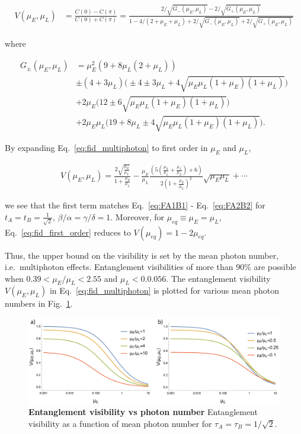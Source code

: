 \documentclass[11pt]{caltech_thesis} %
\begin{document}
\hypertarget{eq:fid_multiphoton}{}{
\begin{align}
    V(\mu_E, \mu_L) &= \frac{C(0)-C(\pi)}{C(0)+C(\pi)}=\frac{2/\sqrt{G_{-}(\mu_E, \mu_L)}-2/\sqrt{G_{+}(\mu_E, \mu_L)}}{1-4/(2+\mu_E+\mu_L)+2/\sqrt{G_{-}(\mu_E, \mu_L)}+2/\sqrt{G_{+}(\mu_E, \mu_L)}}\label{eq:fid_multiphoton}
\end{align}
}

where

\begin{align}
     G_{\pm}(\mu_E, \mu_L)&=\mu_E^2(9+8\mu_L(2+\mu_L))\\
     &\pm(4+3\mu_L)\bigg(\pm4\pm3\mu_L+4\sqrt{\mu_E \mu_L (1+\mu_E)(1+\mu_L)}\bigg)\nonumber\\     &+2\mu_E\bigg(12\pm6\sqrt{\mu_E\mu_L(1+\mu_E)(1+\mu_L)}\bigg)\nonumber\\
     &+2\mu_E\mu_L\Big(19+8\mu_L \pm 4\sqrt{\mu_E\mu_L (1+\mu_E)(1+\mu_L)}\Big). \nonumber
 \end{align}

By expanding Eq.~\ref{eq:fid_multiphoton} to first order in $\mu_E$ and $\mu_L$,

\hypertarget{eq:fid_first_order}{}{
\begin{align}
    V(\mu_E,\mu_L) = \frac{2\sqrt{\frac{\mu_E}{\mu_L}}}{1+\frac{\mu_E}{\mu_L}} - \frac{\mu_E}{\mu_L}\frac{\left(5(\frac{\mu_E}{\mu_L}+\frac{\mu_L}{\mu_E})+6\right)}{2(1+\frac{\mu_E}{\mu_L})^2}\sqrt{\mu_E\mu_L}+\cdots\label{eq:fid_first_order}
\end{align}
}

we see that the first term matches Eq.~\ref{eq:FA1B1} - Eq.~\ref{eq:FA2B2} for $t_A = t_B = \frac{1}{\sqrt{2}}$, $\beta/\alpha = \gamma/\delta = 1$. Moreover, for $\mu_{eq} \equiv \mu_E = \mu_L$, Eq.~\ref{eq:fid_first_order} reduces to $V(\mu_{eq}) = 1 - 2\mu_{eq}$.

Thus, the upper bound on the visibility is set by the mean photon number, i.e.~multiphoton effects. Entanglement visibilities of more than 90\% are possible when $0.39 < \mu_E/\mu_L < 2.55$ and $\mu_L < 0.0.056$. The entanglement visibility $V(\mu_E, \mu_L)$ in Eq.~\ref{eq:fid_multiphoton} is plotted for various mean photon numbers in Fig.~\ref{fig:fid_multiphoton}.

\hypertarget{fig:fid_multiphoton}{%
\begin{figure}
\centering
\includegraphics[width=1\textwidth,height=\textheight]{./chapter_09/figs/Fid_vs_mu_above_below.png}
\caption[{Entanglement visibility vs photon number}]{\textbf{Entanglement visibility vs photon number} Entanglement visibility as a function of mean photon number for $\tau_A = \tau_B = 1/\sqrt{2}$.}
\label{fig:fid_multiphoton}
\end{figure}
}

\printbibliography
\end{document}
